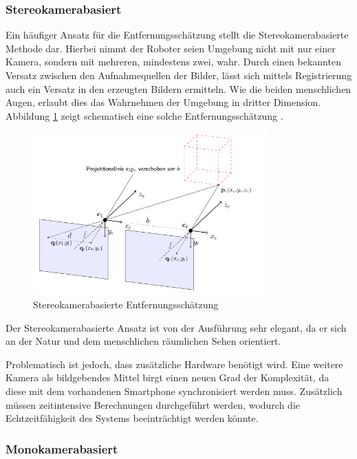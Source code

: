 \subsubsection{Stereokamerabasiert}
\label{subsec:StereoKameraDist}

Ein häufiger Ansatz für die Entfernungsschätzung stellt die Stereokamerabasierte Methode dar. Hierbei nimmt der Roboter seien Umgebung nicht mit nur einer Kamera, sondern mit mehreren, mindestens zwei, wahr. Durch einen bekannten Versatz zwischen den Aufnahmequellen der Bilder, lässt sich mittels Registrierung auch ein Versatz in den erzeugten Bildern ermitteln. Wie die beiden menschlichen Augen, erlaubt dies das Wahrnehmen der Umgebung in dritter Dimension. Abbildung \ref{fig:StereokameraEntfernung} zeigt schematisch eine solche Entfernungsschätzung \cite{bathge20123d}.

\begin{figure}[h]
\centering
\includegraphics[width=0.8\textwidth]{Bilder/Workloop/Stereokamera}
\caption{Stereokamerabasierte Entfernungsschätzung}
\label{fig:StereokameraEntfernung}
\end{figure}

Der Stereokamerabasierte Ansatz ist von der Ausführung sehr elegant, da er sich an der Natur und dem menschlichen räumlichen Sehen orientiert. 

Problematisch ist jedoch, dass zusätzliche Hardware benötigt wird. Eine weitere Kamera als bildgebendes Mittel birgt einen neuen Grad der Komplexität, da diese mit dem vorhandenen Smartphone synchronisiert werden muss. Zusätzlich müssen zeitintensive Berechnungen durchgeführt werden, wodurch die Echtzeitfähigkeit des Systems beeinträchtigt werden könnte.

\subsubsection{Monokamerabasiert}

